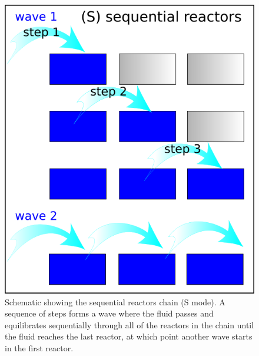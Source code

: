 \documentclass[
]{book}
\begin{document}
\begin{figure}
\includegraphics[width=0.7\linewidth]{figures/module5/fig-1} \caption{Schematic showing the sequential reactors chain (S mode). A sequence of steps forms a wave where the fluid passes and equilibrates sequentially through all of the reactors in the chain until the fluid reaches the last reactor, at which point another wave starts in the first reactor.}\label{fig:fig-1e}
\end{figure}
\end{document}
